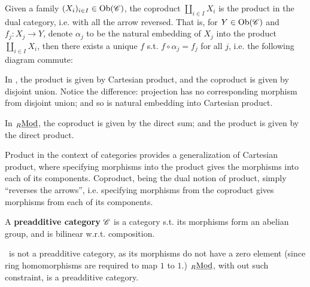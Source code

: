 \begin{definition}[Coproduct]
    Given a family $(X_i)_{i\in I} \in \mathrm{Ob}(\mathscr{C})$, the coproduct $\amalg_{i\in I} X_i$ is the product in the dual category, i.e. with all the arrow reversed. That is, for $Y \in \mathrm{Ob}(\mathscr{C})$ and $f_j: X_j \to Y$, denote $\alpha_j$ to be the natural embedding of $X_j$ into the product $\amalg_{i\in I} X_i$, then there exists a unique $f$ s.t. $f \circ \alpha_j = f_j$ for all $j$, i.e. the following diagram commute:
    \begin{figure}[htbp]
        \centering
    \end{figure}
\end{definition}

\begin{remark}
    In \catsets, the product is given by Cartesian product, and the coproduct is given by disjoint union. Notice the difference: projection has no corresponding morphism from disjoint union; and so is natural embedding into Cartesian product.

    In ${}_{R}\underline{\textup{Mod}}$, the coproduct is given by the direct sum; and the product is given by the direct product. 
\end{remark}

\begin{remark}
    Product in the context of categories provides a generalization of Cartesian product, where specifying morphisms into the product gives the morphisms into each of its components. Coproduct, being the dual notion of product, simply ``reverses the arrows'', i.e. specifying morphisms from the coproduct gives morphisms from each of its components.
\end{remark}

\begin{definition}
    A \textbf{preadditive category} $\mathscr{C}$ is a category s.t. its morphisms form an abelian group, and is bilinear w.r.t. composition. 
\end{definition}

\begin{remark}
    \catrings\ is not a preadditive category, as its morphisms do not have a zero element (since ring homomorphisms are required to map $1$ to $1$.) ${}_{R}\underline{\textup{Mod}}$, with out such constraint, is a preadditive category.
\end{remark}

